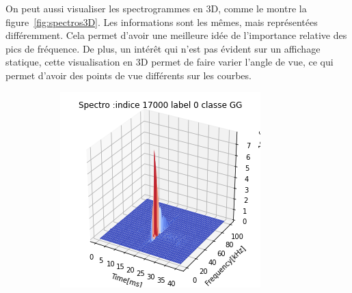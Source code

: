 On peut aussi visualiser les spectrogrammes en 3D, comme le montre la figure~\ref{fig:spectros3D}.
Les informations sont les mêmes, mais représentées différemment.
Cela permet d'avoir une meilleure idée de l'importance relative des pics de fréquence.
De plus, un intérêt qui n'est pas évident sur un affichage statique, cette visualisation en 3D permet de faire varier l'angle de vue, ce qui permet d'avoir des points de vue différents sur les courbes.

\begin{figure}[!h]
  \centering
  \begin{subfigure}[l]{0.5\textwidth}
    \includegraphics[width=\textwidth]{./images/indice17000Spectro3Dlabel0classeGGsansprocessingsanszoom.png}
        \caption{}
  \end{subfigure}
  \newline
  \begin{subfigure}[l]{0.5\textwidth}

\end{subfigure}
\end{figure}
